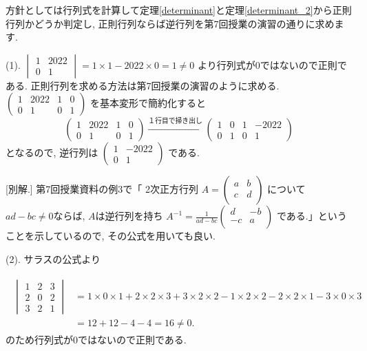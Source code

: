 \documentclass[dvipdfmx,a4paper,11pt]{article}
\theoremstyle{definition}
\begin{document}
 \vspace{11pt}
 
\hspace{-11pt}{\Large $\bullet$ 第1問解答例.}

方針としては行列式を計算して定理\ref{determinant}と定理\ref{determinant_2}から正則行列かどうか判定し, 正則行列ならば逆行列を第7回授業の演習の通りに求めます. 

 \vspace{11pt}
 
(1). 
 $
 \begin{vmatrix}
1& 2022 \\
0& 1
 \end{vmatrix}
 =
 1 \times 1 - 2022 \times 0 
 = 1 \neq 0
 $
 より行列式が0ではないので正則である.
 正則行列を求める方法は第7回授業の演習のように求める. 
 $
 \begin{pmatrix}
1& 2022 &1 & 0 \\
0& 1& 0& 1
 \end{pmatrix}
 $
 を基本変形で簡約化すると
 $$
 \begin{pmatrix}
1& 2022 &1 & 0 \\
0& 1& 0& 1
 \end{pmatrix}
   \overset{\text{１行目で掃き出し}}{\longrightarrow} 
  \begin{pmatrix}
1& 0 &1 & -2022 \\
0& 1& 0& 1
 \end{pmatrix}
 $$
となるので, 逆行列は
$ \begin{pmatrix}
1& -2022 \\
0& 1
 \end{pmatrix}
 $
 である. 

 [別解.] 第7回授業資料の例3で「
2次正方行列
 $A=
  \begin{pmatrix}
 a& b  \\
 c& d  \\
 \end{pmatrix} 
 $
 について
  $ad-bc \neq 0$ならば, $A$は逆行列を持ち
 $
 A^{-1} =   
 \frac{1}{ad-bc}
 \begin{pmatrix}
 d& -b  \\
 -c& a  \\
 \end{pmatrix} 
 $
 である.」ということを示しているので, その公式を用いても良い.
 

(2). サラスの公式より

\begin{align*}
\begin{split}
\begin{vmatrix}
1 &2&3 \\
2 & 0 & 2 \\
3&2 &1 
 \end{vmatrix}
& =
 1 \times 0 \times 1 + 2 \times 2 \times 3 + 3 \times 2 \times 2 
 - 1 \times 2 \times 2 - 2 \times 2 \times 1 - 3 \times 0 \times 3 \\
 & = 12 + 12 - 4 -4 =16 \neq 0.
\end{split}
\end{align*}
 のため行列式が0ではないので正則である. 
 
\end{document}

